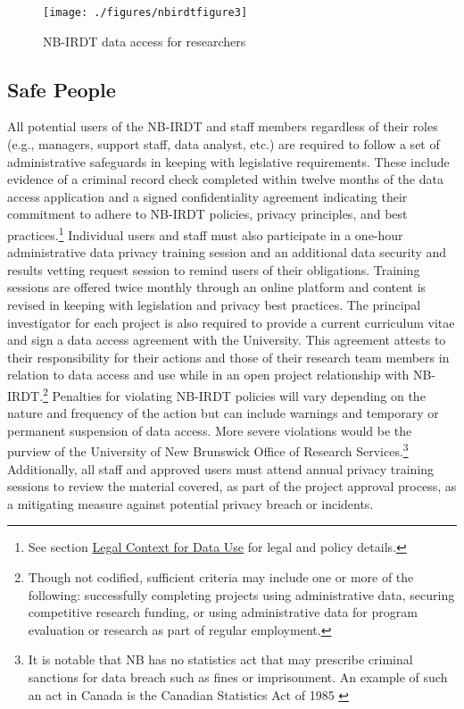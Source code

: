 \begin{figure}
\texttt{[image: ./figures/nbirdtfigure3]} \caption{NB-IRDT data access for researchers}\label{fig:nbirdtfigure3}
\end{figure}

\hypertarget{nbirdt-safepeople}{%
\subsection{Safe People}\label{nbirdt-safepeople}}

All potential users of the NB-IRDT and staff members regardless of their roles (e.g., managers, support staff, data analyst, etc.) are required to follow a set of administrative safeguards in keeping with legislative requirements. These include evidence of a criminal record check completed within twelve months of the data access application and a signed confidentiality agreement indicating their commitment to adhere to NB-IRDT policies, privacy principles, and best practices.\footnote{See section \protect\hyperlink{nbirdt-legaluse}{Legal Context for Data Use} for legal and policy details.} Individual users and staff must also participate in a one-hour administrative data privacy training session and an additional data security and results vetting request session to remind users of their obligations. Training sessions are offered twice monthly through an online platform and content is revised in keeping with legislation and privacy best practices. The principal investigator for each project is also required to provide a current curriculum vitae and sign a data access agreement with the University. This agreement attests to their responsibility for their actions and those of their research team members in relation to data access and use while in an open project relationship with NB-IRDT.\footnote{Though not codified, sufficient criteria may include one or more of the following: successfully completing projects using administrative data, securing competitive research funding, or using administrative data for program evaluation or research as part of regular employment.} Penalties for violating NB-IRDT policies will vary depending on the nature and frequency of the action but can include warnings and temporary or permanent suspension of data access. More severe violations would be the purview of the University of New Brunswick Office of Research Services.\footnote{It is notable that NB has no statistics act that may prescribe criminal sanctions for data breach such as fines or imprisonment. An example of such an act in Canada is the Canadian Statistics Act of 1985 \citep{governmentofcanada1985}} Additionally, all staff and approved users must attend annual privacy training sessions to review the material covered, as part of the project approval process, as a mitigating measure against potential privacy breach or incidents.

